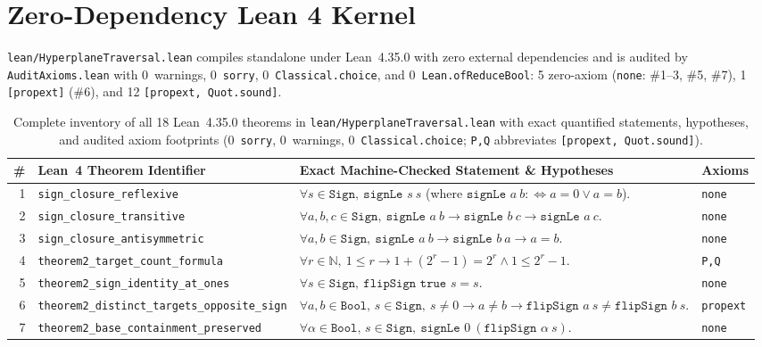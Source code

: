 \documentclass[10pt,twocolumn]{article}
\begin{document}
\section{Zero-Dependency Lean 4 Kernel}\label{sec:lean}
\texttt{lean/HyperplaneTraversal.lean} compiles standalone under Lean~4.35.0 with zero external dependencies and is audited by \texttt{AuditAxioms.lean} with 0~warnings, 0~\texttt{sorry}, 0~\texttt{Classical.choice}, and 0~\texttt{Lean.ofReduceBool}: 5 zero-axiom (\texttt{none}: \#1--3, \#5, \#7), 1 \texttt{[propext]} (\#6), and 12 \texttt{[propext, Quot.sound]}.

\begin{table}[t]
\centering
\caption{Complete inventory of all 18 Lean~4.35.0 theorems in \texttt{lean/HyperplaneTraversal.lean} with exact quantified statements, hypotheses, and audited axiom footprints (0~\texttt{sorry}, 0~warnings, 0~\texttt{Classical.choice}; \texttt{P,Q} abbreviates \texttt{[propext, Quot.sound]}).}
\label{tab:lean}
\scriptsize
\setlength{\tabcolsep}{2.8pt}
\begin{tabular}{@{}r l p{10.5cm} l@{}}
\toprule
\# & Lean~4 Theorem Identifier & Exact Machine-Checked Statement \& Hypotheses & Axioms \\
\midrule
1 & \texttt{sign\_closure\_reflexive} & $\forall s\in\texttt{Sign},\ \texttt{signLe } s\ s$ (where $\texttt{signLe } a\ b :\!\iff a=0 \vee a=b$). & \texttt{none} \\
2 & \texttt{sign\_closure\_transitive} & $\forall a,b,c\in\texttt{Sign},\ \texttt{signLe } a\ b \to \texttt{signLe } b\ c \to \texttt{signLe } a\ c$. & \texttt{none} \\
3 & \texttt{sign\_closure\_antisymmetric} & $\forall a,b\in\texttt{Sign},\ \texttt{signLe } a\ b \to \texttt{signLe } b\ a \to a = b$. & \texttt{none} \\
4 & \texttt{theorem2\_target\_count\_formula} & $\forall r\in\mathbb{N},\ 1\le r \to 1 + (2^r - 1) = 2^r \wedge 1 \le 2^r - 1$. & \texttt{P,Q} \\
5 & \texttt{theorem2\_sign\_identity\_at\_ones} & $\forall s\in\texttt{Sign},\ \texttt{flipSign true } s = s$. & \texttt{none} \\
6 & \texttt{theorem2\_distinct\_targets\_opposite\_sign} & $\forall a,b\in\texttt{Bool},\,s\in\texttt{Sign},\ s\ne 0 \to a\ne b \to \texttt{flipSign } a\ s \ne \texttt{flipSign } b\ s$. & \texttt{propext} \\
7 & \texttt{theorem2\_base\_containment\_preserved} & $\forall \alpha\in\texttt{Bool},\,s\in\texttt{Sign},\ \texttt{signLe } 0\ (\texttt{flipSign } \alpha\ s)$. & \texttt{none} \\

\end{tabular}
\end{table}
\end{document}
